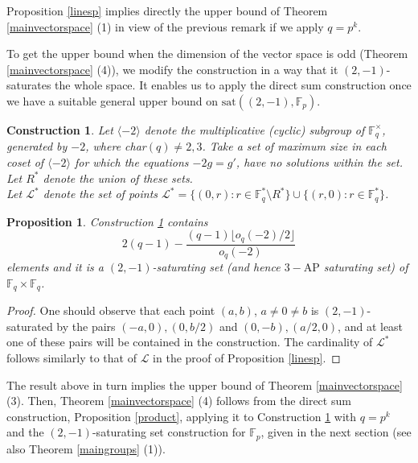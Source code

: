 \documentclass[11pt]{article}
\numberwithin{table}{section}
\newcommand{\cL}{{\mathcal L}}
\newcommand{\F}{{\mathbb F}}
\newcommand{\sat}{\mathrm{sat}}
\newtheorem{constr}[theorem]{\bf Construction}
\newtheorem{prop}[theorem]{\bf Proposition}
\theoremstyle{definition}
\begin{document}
	Proposition \ref{linesp} implies directly the upper bound of Theorem \ref{mainvectorspace}  (1) in view of the previous remark if we apply  $q=p^{k}$. 
	
	To get the upper bound when the dimension of the vector space is odd (Theorem \ref{mainvectorspace} (4)), we modify the construction in a way that it $(2, -1)$-saturates the whole space. It enables us to apply the direct sum construction once we have a suitable general upper bound on $\sat((2, -1), \F_p)$.
	
	
	
	\begin{constr}
		\label{lines(2,-1)} Let $\langle -2 \rangle$ denote the multiplicative (cyclic) subgroup of $\F_q^\times$, generated by $-2$, where char$(q)\neq 2,3$. Take a set of maximum size in each coset of $\langle -2 \rangle$ for which the equations $-2g=g'$,  have no solutions within the set. Let $R^*$ denote the union of these sets.\\
		Let $\cL^*$ denote the set of points $\cL^*=\{(0,r) :  r\in \F_q^* \setminus R^*  \}\cup\{(r,0): r\in \F_q^*   \}$. 
	\end{constr}
	
	
	\begin{prop}
		\label{linesp2}
		Construction \ref{lines(2,-1)} contains $$2(q-1)-\frac{(q-1)\lfloor o_q(-2)/2\rfloor}{o_q(-2)}$$ elements and it is a $(2, -1)$-saturating  set (and hence $3-\mathrm{AP}$ saturating set)  of $\F_q\times \F_q$.  
	\end{prop}
	
	\begin{proof}
		One should observe that each point $(a,b)$, $a\neq 0\neq b$ is $(2,-1)$-saturated by the pairs  $(-a, 0), (0, b/2)$ and 
		$(0,-b), (a/2, 0)$, and at least one of these pairs will be contained in the construction. The cardinality of $\cL^*$ follows similarly to that of $\cL$ in the proof of Proposition \ref{linesp}.
	\end{proof}
	
	The result above in turn implies the upper bound of Theorem \ref{mainvectorspace} (3). Then,  Theorem \ref{mainvectorspace} (4) follows from the direct sum construction, Proposition \ref{product}, applying it to Construction \ref{lines(2,-1)} with $q=p^k$ and the $(2, -1)$-saturating set construction for $\F_p$, given in the next section (see also Theorem \ref{maingroups} (1)). 
	
	
\end{document}
